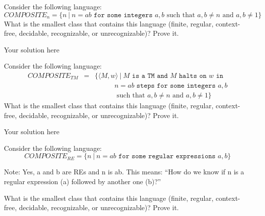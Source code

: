 \documentclass[12pt]{article}
\newenvironment{exercise}[2][Exercise]{\begin{trivlist}
\item[\hskip \labelsep {\bfseries #1}\hskip \labelsep {\bfseries #2.}]}{\end{trivlist}}
\newenvironment{solution}[1][{\color{red} Solution:}]{\begin{trivlist}
\item[\hskip \labelsep {\bfseries #1}\hskip \labelsep {\bfseries}]}{\end{trivlist}}
\begin{document}
 


\newcommand{\studentName}{YOUR NAME HERE} %

\newcommand{\collaborators}{
	with \textit{COLLABORATORS' NAMES HERE}
}

\begin{exercise}{1}
Consider the following language:
\[COMPOSITE_n = \{n \ | \ n = ab \texttt{ for some integers } a,b \text{ such that } a, b \neq n \text{ and } a, b \neq 1  \}\]
What is the smallest class that contains this language (finite, regular, context-free, decidable, recognizable, or unrecognizable)? Prove it.
\end{exercise}

\begin{solution}
Your solution here
\end{solution}

\clearpage

\begin{exercise}{2}
Consider the following language:
\begin{eqnarray*}
COMPOSITE_{TM} & = & \{\langle M,w \rangle \ | \ M \texttt{ is a TM and } M \texttt{ halts on } w \texttt{ in }\\
&& \ \ \ \ \ \ \ \ \ \ \ \ \ n = ab \texttt{ steps for some integers } a,b\\
&& \ \ \ \ \ \ \ \ \ \ \ \ \ \text{ such that } a, b \neq n \text{ and } a, b \neq 1\}
\end{eqnarray*}
What is the smallest class that contains this language (finite, regular, context-free, decidable, recognizable, or unrecognizable)? Prove it.
\end{exercise}

\begin{solution}
Your solution here
\end{solution}

\clearpage
\begin{exercise}{3}
Consider the following language:
\[COMPOSITE_{RE} = \{n \ | \ n = ab \texttt{ for some regular expressions } a,b\}\]

Note: Yes, a and b are REs and n is ab. This means: ``How do we know if n is a regular expression (a)  followed by another one (b)?''

What is the smallest class that contains this language (finite, regular, context-free, decidable, recognizable, or unrecognizable)? Prove it.
\end{exercise}
\end{document}

